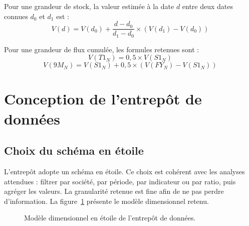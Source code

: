 \par Pour une grandeur de stock, la valeur estimée à la date $d$ entre deux
dates connues $d_0$ et $d_1$ est :
\begin{equation}
V(d) = V(d_0) + \frac{d-d_0}{d_1-d_0}\times\left(V(d_1)-V(d_0)\right)
\end{equation}

\par Pour une grandeur de flux cumulée, les formules retenues sont :
\begin{equation}
V(T1_N) = 0{,}5 \times V(S1_N)
\end{equation}
\begin{equation}
V(9M_N) = V(S1_N) + 0{,}5 \times \left(V(FY_N)-V(S1_N)\right)
\end{equation}

\section{Conception de l'entrepôt de données}
\label{sec:concep_dw}
\subsection{Choix du schéma en étoile}
\par L'entrepôt adopte un schéma en étoile. Ce choix est cohérent avec les
analyses attendues : filtrer par société, par période, par indicateur ou par
ratio, puis agréger les valeurs. La granularité retenue est fine afin de ne pas
perdre d'information. La figure~\ref{fig:etoile} présente le modèle dimensionnel
retenu.

\begin{figure}[H]
\centering
{}
\caption[Modèle dimensionnel en étoile]{Modèle dimensionnel en étoile de l'entrepôt de données.}
\label{fig:etoile}
\end{figure}

